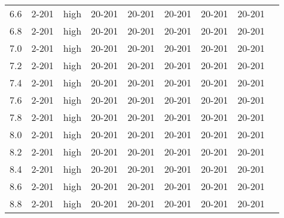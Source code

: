 \documentclass{article}
\begin{document}
\begin{center}
\begin{tabular}{| c | c | c | c | c | c | c | c | c |}
      6.6 & 2-201 & high & 20-201 & 20-201 & 20-201 & 20-201 & 20-201 &\\
      6.8 & 2-201 & high & 20-201 & 20-201 & 20-201 & 20-201 & 20-201 &\\
      7.0 & 2-201 & high & 20-201 & 20-201 & 20-201 & 20-201 & 20-201 &\\
      7.2 & 2-201 & high & 20-201 & 20-201 & 20-201 & 20-201 & 20-201 &\\
      7.4 & 2-201 & high & 20-201 & 20-201 & 20-201 & 20-201 & 20-201 &\\
      7.6 & 2-201 & high & 20-201 & 20-201 & 20-201 & 20-201 & 20-201 &\\
      7.8 & 2-201 & high & 20-201 & 20-201 & 20-201 & 20-201 & 20-201 &\\
      8.0 & 2-201 & high & 20-201 & 20-201 & 20-201 & 20-201 & 20-201 &\\
      8.2 & 2-201 & high & 20-201 & 20-201 & 20-201 & 20-201 & 20-201 &\\
      8.4 & 2-201 & high & 20-201 & 20-201 & 20-201 & 20-201 & 20-201 &\\
      8.6 & 2-201 & high & 20-201 & 20-201 & 20-201 & 20-201 & 20-201 &\\
      8.8 & 2-201 & high & 20-201 & 20-201 & 20-201 & 20-201 & 20-201 &\\
      \hline
    \end{tabular}
    \end{center}
\end{document}
